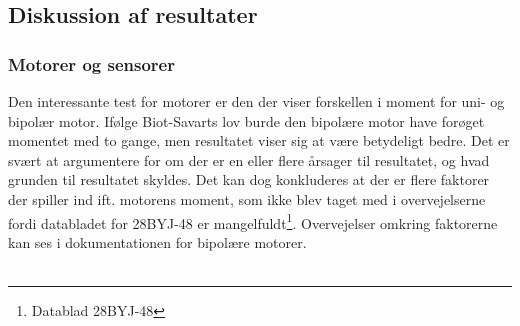\subsection{Diskussion af resultater}
\subsubsection{Motorer og sensorer}
\label{sec:HW_diskussion}
Den interessante test for motorer er den der viser forskellen i moment for uni- og bipolær motor. Ifølge Biot-Savarts lov burde den bipolære motor have forøget momentet med to gange, men resultatet viser sig at være betydeligt bedre. Det er svært at argumentere for om der er en eller flere årsager til resultatet, og hvad grunden til resultatet skyldes. Det kan dog konkluderes at der er flere faktorer der spiller ind ift. motorens moment, som ikke blev taget med i overvejelserne fordi databladet for 28BYJ-48 er mangelfuldt\footnote{Datablad 28BYJ-48}. Overvejelser omkring faktorerne kan ses i dokumentationen for bipolære motorer.
\\
\\

